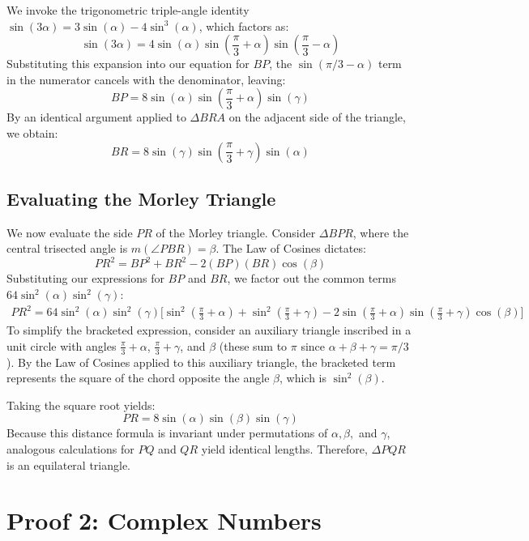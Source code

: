 \documentclass{amsart}
\begin{document}
	We invoke the trigonometric triple-angle identity $\sin(3\alpha) = 3\sin(\alpha) - 4\sin^3(\alpha)$, which factors as:
	\[
	\sin(3\alpha) = 4 \sin(\alpha) \sin\left(\frac{\pi}{3} + \alpha\right) \sin\left(\frac{\pi}{3} - \alpha\right)
	\]
	Substituting this expansion into our equation for $BP$, the $\sin(\pi/3 - \alpha)$ term in the numerator cancels with the denominator, leaving:
	\[ 
	BP = 8 \sin(\alpha) \sin\left(\frac{\pi}{3} + \alpha\right) \sin(\gamma) 
	\]
	By an identical argument applied to $\Delta BRA$ on the adjacent side of the triangle, we obtain:
	\[ 
	BR = 8 \sin(\gamma) \sin\left(\frac{\pi}{3} + \gamma\right) \sin(\alpha) 
	\]
	
	\subsection{Evaluating the Morley Triangle}
	We now evaluate the side $PR$ of the Morley triangle. Consider $\Delta BPR$, where the central trisected angle is $m(\angle PBR) = \beta$. The Law of Cosines dictates:
	\[ 
	PR^2 = BP^2 + BR^2 - 2(BP)(BR)\cos(\beta) 
	\]
	Substituting our expressions for $BP$ and $BR$, we factor out the common terms $64 \sin^2(\alpha) \sin^2(\gamma)$:
	\begin{multline*} 
		PR^2 = 64 \sin^2(\alpha) \sin^2(\gamma) \bigg[ \sin^2\left(\frac{\pi}{3} + \alpha\right) + \sin^2\left(\frac{\pi}{3} + \gamma\right) 
		- 2 \sin\left(\frac{\pi}{3} + \alpha\right) \sin\left(\frac{\pi}{3} + \gamma\right) \cos(\beta) \bigg] 
	\end{multline*}
	To simplify the bracketed expression, consider an auxiliary triangle inscribed in a unit circle with angles $\frac{\pi}{3}+\alpha$, $\frac{\pi}{3}+\gamma$, and $\beta$ (these sum to $\pi$ since $\alpha+\beta+\gamma = \pi/3$). By the Law of Cosines applied to this auxiliary triangle, the bracketed term represents the square of the chord opposite the angle $\beta$, which is $\sin^2(\beta)$. 
	
	Taking the square root yields:
	\[
	PR = 8 \sin(\alpha) \sin(\beta) \sin(\gamma)
	\]
	Because this distance formula is invariant under permutations of $\alpha, \beta,$ and $\gamma$, analogous calculations for $PQ$ and $QR$ yield identical lengths. Therefore, $\Delta PQR$ is an equilateral triangle.
	
	\section{Proof 2: Complex Numbers}
	
\end{document}
